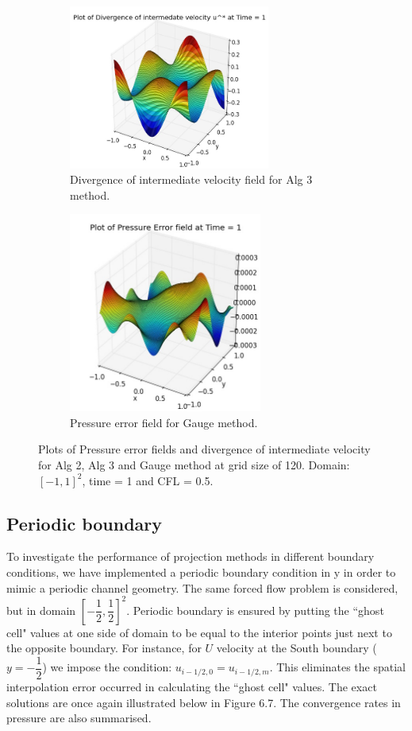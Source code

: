\begin{figure}[H]
\begin{subfigure}[t]{2.2in}
	\end{subfigure}
	\quad
	\begin{subfigure}[t]{2.6in}
		\centering
		\includegraphics[width=2.6in]{figures/Pm2_pf2_cN_np_div_uvstar_t_1_grid_120.jpg}
		\caption{Divergence of intermediate velocity field for Alg 3 method.}\label{fig:6.19d}
	\end{subfigure}
	\quad
	\begin{subfigure}[t]{2.5in}
		\centering
		\includegraphics[width=2.5in]{figures/Gauge_pf2_P_error_t_1_grid_120.jpg}
		\caption{Pressure error field for Gauge method. }\label{fig:6.19d}
	\end{subfigure}
	\caption{Plots of Pressure error fields and divergence of intermediate velocity for Alg 2, Alg 3 and Gauge method at grid size of 120. Domain: $[-1,1]^2$, time = 1 and CFL = 0.5. }\label{fig:6.16}
\end{figure}

\subsection*{Periodic boundary}
To investigate the performance of projection methods in different boundary conditions, we have implemented a periodic boundary condition in y in order to mimic a periodic channel geometry. The same forced flow problem is considered, but in domain $[-\dfrac{1}{2},\dfrac{1}{2}]^2$. Periodic boundary is ensured by putting the ``ghost cell" values at one side of domain to be equal to the interior points just next to the opposite boundary. For instance, for $U$ velocity at the South boundary ($y = -\dfrac{1}{2}$) we impose the condition: $u_{i-1/2,0} = u_{i-1/2,m}$. This eliminates the spatial interpolation error occurred in calculating the ``ghost cell" values. The exact solutions are once again illustrated below in Figure 6.7. The convergence rates in pressure are also summarised.\\

